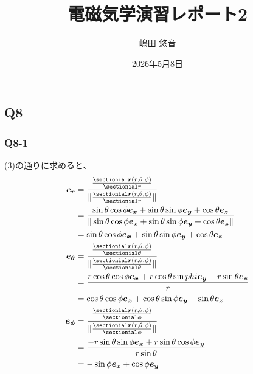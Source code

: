 \documentclass[platex,dvipdfmx,a4paper]{jsarticle}
\title{電磁気学演習レポート2}
\author{嶋田 悠音}
\date{2026年5月8日}
\newcommand{\hb}[2]{\frac{\sectionial #1}{\sectionial #2}}
\newcommand{\vect}[1]{\boldsymbol{#1}}
\begin{document}
  \maketitle
  \subsection*{Q8}
  \subsubsection*{Q8-1}
  (3)の通りに求めると、
  \begin{align*}
    \vect{e_r} &= \frac{\hb{\vect{r}(r,\theta,\phi)}{r}}{\|\hb{\vect{r}(r,\theta,\phi)}{r}\|}\\
               &=\frac{\sin{\theta}\cos{\phi}\vect{e_x}+\sin{\theta}\sin{\phi}\vect{e_y}+\cos{\theta}\vect{e_z}}{\|\sin{\theta}\cos{\phi}\vect{e_x}+\sin{\theta}\sin{\phi}\vect{e_y}+\cos{\theta}\vect{e_z}\|}\\
               &=\sin{\theta}\cos{\phi}\vect{e_x}+\sin{\theta}\sin{\phi}\vect{e_y}+\cos{\theta}\vect{e_z}\\
    \vect{e_\theta} &= \frac{\hb{\vect{r}(r,\theta,\phi)}{\theta}}{\|\hb{\vect{r}(r,\theta,\phi)}{\theta}\|}\\
                    &=\frac{r\cos{\theta}\cos{\phi}\vect{e_x}+r\cos{\theta}\sin{phi}\vect{e_y}-r\sin{\theta}\vect{e_z}}{r}\\
                    &=\cos{\theta}\cos{\phi}\vect{e_x}+\cos{\theta}\sin{\phi}\vect{e_y}-\sin{\theta}\vect{e_z}\\
    \vect{e_\phi} &= \frac{\hb{\vect{r}(r,\theta,\phi)}{\phi}}{\|\hb{\vect{r}(r,\theta,\phi)}{\phi}\|}\\
                  &=\frac{-r\sin{\theta}\sin{\phi}\vect{e_x}+r\sin{\theta}\cos{\phi}\vect{e_y}}{r\sin{\theta}}\\
                  &=-\sin{\phi}\vect{e_x}+\cos{\phi}\vect{e_y}
  \end{align*}
  
\end{document}
